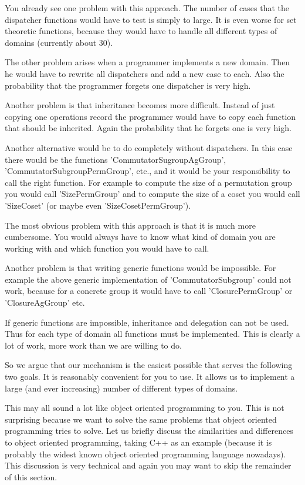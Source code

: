 You already see one problem with this approach.  The number of cases that
the  dispatcher functions  would have to test is  simply to large.  It is
even worse for set theoretic functions, because they would have to handle
all different types of domains (currently about 30).

The other problem arises when a programmer implements a new domain.  Then
he would  have  to  rewrite all dispatchers  and add a  new case to each.
Also the probability that the programmer forgets  one  dispatcher is very
high.

Another problem is that  inheritance becomes more difficult.  Instead  of
just copying one operations record the programmer would have to copy each
function that should be inherited.  Again the probability that he forgets
one is very high.

Another alternative would be  to  do completely without  dispatchers.  In
this  case  there  would  be  the  functions  'CommutatorSugroupAgGroup',
'CommutatorSubgroupPermGroup', etc., and it  would be your responsibility
to call  the  right  function.   For  example to  compute the  size  of a
permutation group you would call 'SizePermGroup'  and to compute the size
of    a   coset   you    would   call   'SizeCoset'    (or   maybe   even
'SizeCosetPermGroup').

The most  obvious problem  with  this  approach is  that it is  much more
cumbersome.  You would  always  have to know what  kind of domain you are
working with and which function you would have to call.

Another  problem  is that writing generic  functions would be impossible.
For example  the  above  generic  implementation of  'CommutatorSubgroup'
could  not work,  because for a  concrete  group  it  would have  to call
'ClosurePermGroup' or 'ClosureAgGroup' etc.

If generic functions are impossible, inheritance and  delegation can  not
be used.  Thus for each type of domain all functions must be implemented.
This is clearly a lot of work, more work than we are willing to do.

So  we argue that  our  mechanism is the easiest possible that serves the
following two goals.  It is  reasonably  convenient for  you to use.   It
allows us to implement a large (and ever increasing) number of  different
types of domains.

This  may all sound a  lot like object oriented programming to you.  This
is not surprising because we want to solve the same problems that  object
oriented  programming  tries  to  solve.   Let  us  briefly  discuss  the
similarities and  differences to  object oriented programming, taking C++
as an example (because  it is probably  the widest known  object oriented
programming language  nowadays).   This  discussion is very technical and
again you may want to skip the remainder of this section.

